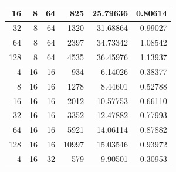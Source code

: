 \documentclass[journal,transmag]{IEEEtran}
\begin{document}
\begin{table}[h]
\begin{tabular}{|r|r|r|r|r|r|}
		16                            & 8                          & 64                               & 825                            & 25.79636                      & 0.80614                         \\ \hline
		32                            & 8                          & 64                               & 1320                           & 31.68864                      & 0.99027                         \\ \hline
		64                            & 8                          & 64                               & 2397                           & 34.73342                      & 1.08542                         \\ \hline
		128                           & 8                          & 64                               & 4535                           & 36.45976                      & 1.13937                         \\ \hline
		4                             & 16                         & 16                               & 934                            & 6.14026                       & 0.38377                         \\ \hline
		8                             & 16                         & 16                               & 1278                           & 8.44601                       & 0.52788                         \\ \hline
		16                            & 16                         & 16                               & 2012                           & 10.57753                      & 0.66110                         \\ \hline
		32                            & 16                         & 16                               & 3352                           & 12.47882                      & 0.77993                         \\ \hline
		64                            & 16                         & 16                               & 5921                           & 14.06114                      & 0.87882                         \\ \hline
		128                           & 16                         & 16                               & 10997                          & 15.03546                      & 0.93972                         \\ \hline
		4                             & 16                         & 32                               & 579                            & 9.90501                       & 0.30953                         \\ \hline

\end{tabular}
\end{table}
\end{document}
